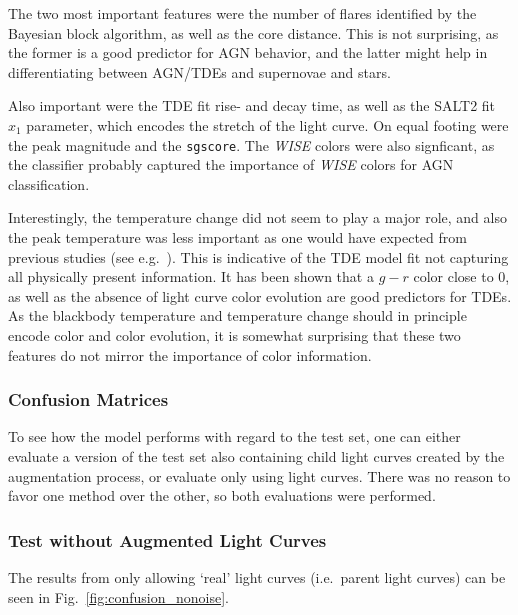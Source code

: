 The two most important features were the number of flares identified by the Bayesian block algorithm, as well as the core distance. This is not surprising, as the former is a good predictor for AGN behavior, and the latter might help in differentiating between AGN/TDEs and supernovae and stars.

Also important were the TDE fit rise- and decay time, as well as the SALT2 fit $x_1$ parameter, which encodes the stretch of the light curve. On equal footing were the peak magnitude and the \texttt{sgscore}. The \textit{WISE} colors were also signficant, as the classifier probably captured the importance of \textit{WISE} colors for AGN classification.

Interestingly, the temperature change did not seem to play a major role, and also the peak temperature was less important as one would have expected from previous studies (see e.g.~\cite{Velzen2021a}). This is indicative of the TDE model fit not capturing all physically present information. It has been shown that a $g-r$ color close to 0, as well as the absence of light curve color evolution are good predictors for TDEs. As the blackbody temperature and temperature change should in principle encode color and color evolution, it is somewhat surprising that these two features do not mirror the importance of color information.

\subsubsection{Confusion Matrices}\label{confusion_matrices}
To see how the model performs with regard to the test set, one can either evaluate a version of the test set also containing child light curves created by the augmentation process, or evaluate only using light curves. There was no reason to favor one method over the other, so both evaluations were performed.

\subsubsection{Test without Augmented Light Curves}
The results from only allowing `real' light curves (i.e.~parent light curves) can be seen in Fig.~\ref{fig:confusion_nonoise}.

